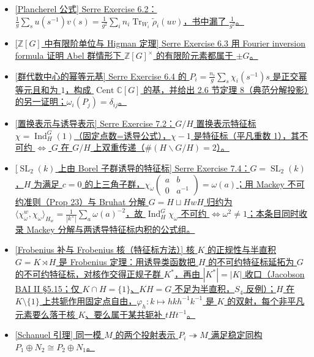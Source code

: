\documentclass[a4paper]{ctexart}
\theoremstyle{definition}
\theoremstyle{analysis}
\theoremstyle{plain}
\begin{document}
\begin{itemize}
  \item \hyperref[subsec:problem-serre-plancherel-formula]{[Plancherel 公式] Serre Exercise 6.2：\(\frac{1}{g}\sum_s u(s^{-1})v(s)=\frac{1}{g^2}\sum_i n_i\operatorname{Tr}_{W_i}\tilde\rho_i(uv)\)，书中漏了 \(\frac{1}{g^2}\)。}
  \item \hyperref[subsec:problem-serre-higman-units]{[\(\mathbb Z[G]\) 中有限阶单位与 Higman 定理] Serre Exercise 6.3 用 Fourier inversion formula 证明 Abel 群情形下 \(\mathbb Z[G]^\times\) 的有限阶元素都属于 \(\pm G\)。}
  \item \hyperref[subsec:problem-serre-center-idempotents]{[群代数中心的幂等元基] Serre Exercise 6.4 的 \(P_i=\frac{n_i}{g}\sum_s\chi_i(s^{-1})s\) 是正交幂等元且和为 \(1\)，构成 \(\operatorname{Cent}\mathbb C[G]\) 的基，并给出 2.6 节定理 8（典范分解投影）的另一证明；\(\omega_i(P_j)=\delta_{ij}\)。}
  \item \hyperref[subsec:problem-serre-permutation-induced-char]{[置换表示与诱导表示] Serre Exercise 7.2：\(G/H\) 置换表示特征标 \(\chi=\operatorname{Ind}_H^G(1)\)（固定点数=诱导公式），\(\chi-1\) 是特征标（平凡重数 1），其不可约 \(\iff\) \(G\) 在 \(G/H\) 上双重传递（\(\#(H\backslash G/H)=2\)）。}
  \item \hyperref[subsec:problem-serre-sl2-induced-mackey]{[\(\operatorname{SL}_2(k)\) 上由 Borel 子群诱导的特征标] Serre Exercise 7.4：\(G=\operatorname{SL}_2(k)\)，\(H\) 为满足 \(c=0\) 的上三角子群，\(\chi_\omega(\begin{smallmatrix}a&b\\0&a^{-1}\end{smallmatrix})=\omega(a)\)；用 Mackey 不可约准则（Prop 23）与 Bruhat 分解 \(G=H\sqcup HwH\) 归约为 \(\langle\chi_\omega^w,\chi_\omega\rangle_{H_w}=\frac{1}{|k^\times|}\sum_a\omega(a)^{-2}\)，故 \(\operatorname{Ind}_H^G\chi_\omega\) 不可约 \(\iff\omega^2\neq 1\)；本条目同时收录 Mackey 分解与两诱导特征标内积的公式组。}
  \item \hyperref[subsec:problem-frobenius-complement-kernel]{[Frobenius 补与 Frobenius 核（特征标方法）] 核 \(K\) 的正规性与半直积 \(G=K\rtimes H\) 是 Frobenius 定理：用诱导类函数把 \(H\) 的不可约特征标延拓为 \(G\) 的不可约特征标，对核作交得正规子群 \(K^*\)，再由 \(|K^*|=|K|\) 收口（Jacobson BAI II §5.15；仅 \(K\cap H=\{1\}\)、\(KH=G\) 不足为半直积，\(S_4\) 反例）；\(H\) 在 \(K\setminus\{1\}\) 上共轭作用固定点自由，\(\varphi_h\colon k\mapsto hkh^{-1}k^{-1}\) 是 \(K\) 的双射，每个非平凡元素要么落于核 \(K\)、要么属于某共轭补 \(tHt^{-1}\)。}
  \item \hyperref[subsec:problem-schanuel-lemma]{[Schanuel 引理] 同一模 \(M\) 的两个投射表示 \(P_i\twoheadrightarrow M\) 满足稳定同构 \(P_1\oplus N_2\cong P_2\oplus N_1\)。}

\end{itemize}
\end{document}
